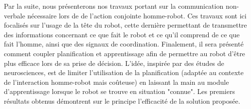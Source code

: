 \documentclass[english,a4paper,11pt,twoside]{StyleThese}
\begin{document}
Par la suite, nous présenterons nos travaux portant sur la communication non-verbale nécessaire lors de de l'action conjointe homme-robot. Ces travaux sont ici focalisés sur l'usage de la tête du robot, cette dernière permettant de transmettre des informations concernant ce que fait le robot et ce qu'il comprend de ce que fait l'homme, ainsi que des signaux de coordination.
Finalement, il sera présenté comment coupler planification et apprentissage afin de permettre au robot d'être plus efficace lors de sa prise de décision. L'idée, inspirée par des études de neurosciences, est de limiter l'utilisation de la planification (adaptée au contexte de l'interaction homme-robot mais coûteuse) en laissant la main au module d'apprentissage lorsque le robot se trouve en situation "connue". Les premiers résultats obtenus démontrent sur le principe l'efficacité de la solution proposée.


\ifdefined{}
\else


\end{document}
